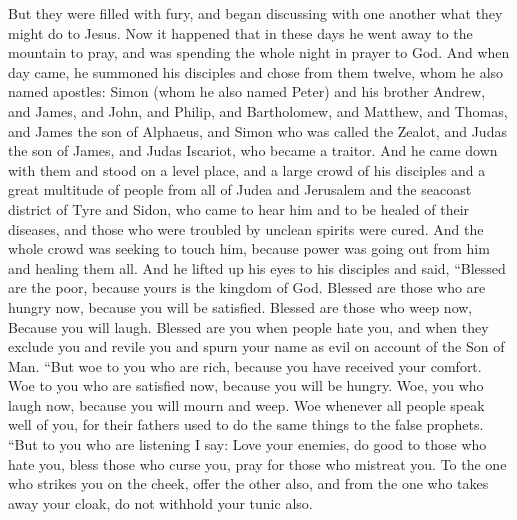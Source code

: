 \begin{biblechapter}
\verse But they were filled with fury, and began discussing with one another what they might do to Jesus.
 Now it happened that in these days he went away to the mountain to pray, and was spending the whole night in prayer to God.
\verse And when day came, he summoned his disciples and chose from them twelve, whom he also named apostles:
\verse Simon (whom he also named Peter) and his brother Andrew, and James, and John, and Philip, and Bartholomew,
\verse and Matthew, and Thomas, and James the son of Alphaeus, and Simon who was called the Zealot,
\verse and Judas the son of James, and Judas Iscariot, who became a traitor.
 And he came down with them and stood on a level place, and a large crowd of his disciples and a great multitude of people from all of Judea and Jerusalem and the seacoast district of Tyre and Sidon,
\verse who came to hear him and to be healed of their diseases, and those who were troubled by unclean spirits were cured.
\verse And the whole crowd was seeking to touch him, because power was going out from him and healing them all.
\verse And he lifted up his eyes to his disciples and said,
\verse “Blessed are the poor, 
because yours is the kingdom of God.
\verse Blessed are those who are hungry now, 
because you will be satisfied. 
Blessed are those who weep now, 
Because you will laugh.
\verse Blessed are you when people hate you, and when they exclude you and revile you and spurn your name as evil on account of the Son of Man.
 “But woe to you who are rich, 
because you have received your comfort.
\verse Woe to you who are satisfied now, 
because you will be hungry. 
Woe, you who laugh now, 
because you will mourn and weep.
\verse Woe whenever all people speak well of you, 
for their fathers used to do the same things to the false prophets.
 “But to you who are listening I say: Love your enemies, do good to those who hate you,
\verse bless those who curse you, pray for those who mistreat you.
\verse To the one who strikes you on the cheek, offer the other also, and from the one who takes away your cloak, do not withhold your tunic also.

\end{biblechapter}
